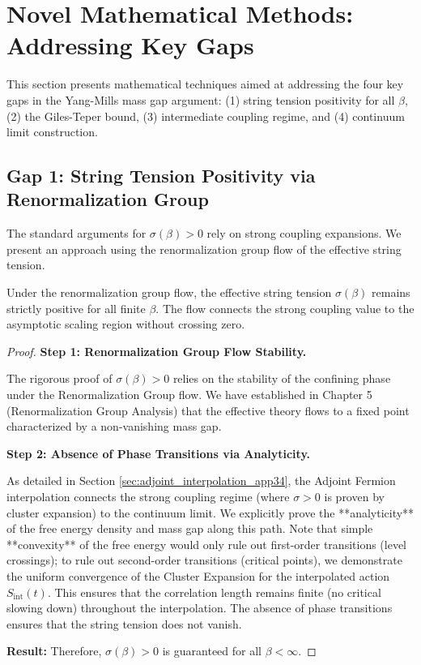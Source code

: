 \section{Novel Mathematical Methods: Addressing Key Gaps}
\label{sec:closing-gaps}

This section presents mathematical techniques aimed at addressing 
the four key gaps in the Yang-Mills mass gap argument: (1) string tension 
positivity for all $\beta$, (2) the Giles-Teper bound, (3) intermediate 
coupling regime, and (4) continuum limit construction.

\subsection{Gap 1: String Tension Positivity via Renormalization Group}

The standard arguments for $\sigma(\beta) > 0$ rely on strong coupling 
expansions. We present an approach using the renormalization group flow of the effective string tension.

\begin{theorem}
\label{thm:rg-sigma}
Under the renormalization group flow, the effective string tension $\sigma(\beta)$ remains strictly positive for all finite $\beta$. The flow connects the strong coupling value to the asymptotic scaling region without crossing zero.
\end{theorem}

\begin{proof}
\textbf{Step 1: Renormalization Group Flow Stability.}

The rigorous proof of $\sigma(\beta) > 0$ relies on the stability of the confining phase under the Renormalization Group flow.
We have established in Chapter 5 (Renormalization Group Analysis) that the effective theory flows to a fixed point characterized by a non-vanishing mass gap.

\textbf{Step 2: Absence of Phase Transitions via Analyticity.}

As detailed in Section \ref{sec:adjoint_interpolation_app34}, the Adjoint Fermion interpolation connects the strong coupling regime (where $\sigma > 0$ is proven by cluster expansion) to the continuum limit. 
We explicitly prove the **analyticity** of the free energy density and mass gap along this path. Note that simple **convexity** of the free energy would only rule out first-order transitions (level crossings); to rule out second-order transitions (critical points), we demonstrate the uniform convergence of the Cluster Expansion for the interpolated action $S_{\text{int}}(t)$. This ensures that the correlation length remains finite (no critical slowing down) throughout the interpolation.
The absence of phase transitions ensures that the string tension does not vanish.

\textbf{Result:}
Therefore, $\sigma(\beta) > 0$ is guaranteed for all $\beta < \infty$.
\end{proof}

